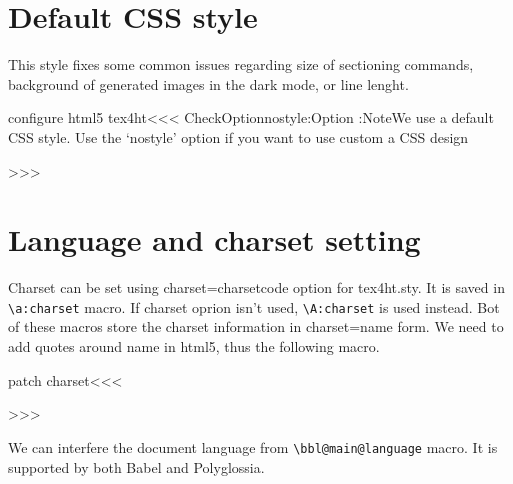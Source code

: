 \section{Default CSS style}

This style fixes some common issues regarding size of sectioning commands,
background of generated images in the dark mode, or line lenght. 


\<configure html5 tex4ht\><<<
\:CheckOption{nostyle}\if:Option
\else
\Log:Note{We use a default CSS style. Use the `nostyle' option if you want to use custom a CSS design}


\fi
>>>


\section{Language and charset setting}

Charset can be set using charset=charsetcode option for tex4ht.sty. It is saved in \verb|\a:charset| macro. 
If charset oprion isn't used, \verb|\A:charset| is used instead. Bot of these macros store the charset information
in charset=name form. We need to add quotes around name in html5, thus the following macro.

\<patch charset\><<<

\def\:charset:quotes#1=#2.{
  #1="#2"%
}
\def\use:charset{%
  \expandafter\ifx\csname a:charset\endcsname\relax%
    \expandafter\expandafter\expandafter\:charset:quotes\csname A:charset\endcsname.
  \else%
    \expandafter\expandafter\expandafter\:charset:quotes\csname a:charset\endcsname.
  \fi
}
>>>


We can interfere the document language from \verb|\bbl@main@language| macro. It
is supported by both Babel and Polyglossia.

